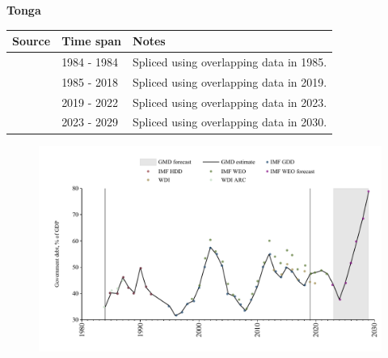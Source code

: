 \documentclass[12pt,a4paper,landscape]{article}
\begin{document}
\begin{adjustbox}{max totalsize={\paperwidth}{\paperheight},center}
\begin{minipage}[t][\textheight][t]{\textwidth}
\vspace*{0.5cm}
{}
\begin{center}
{\Large\bfseries Tonga}
\end{center}
\vspace{0.5cm}
\begin{table}[H]
\centering
\small
\begin{tabular}{|l|l|l|}
\hline
\textbf{Source} & \textbf{Time span} & \textbf{Notes} \\
\hline
\rowcolor{white}\cite{WDI_ARC}& 1984 - 1984 &Spliced using overlapping data in 1985.\\
\rowcolor{lightgray}\cite{IMF_GDD}& 1985 - 2018 &Spliced using overlapping data in 2019.\\
\rowcolor{white}\cite{IMF_WEO}& 2019 - 2022 &Spliced using overlapping data in 2023.\\
\rowcolor{lightgray}\cite{IMF_WEO_forecast}& 2023 - 2029 &Spliced using overlapping data in 2030.\\
\hline
\end{tabular}
\end{table}
\begin{figure}[H]
\centering
\includegraphics[width=\textwidth,height=0.6\textheight,keepaspectratio]{graphs/TON_govdebt_GDP.pdf}
\end{figure}
\end{minipage}
\end{adjustbox}
\end{document}
